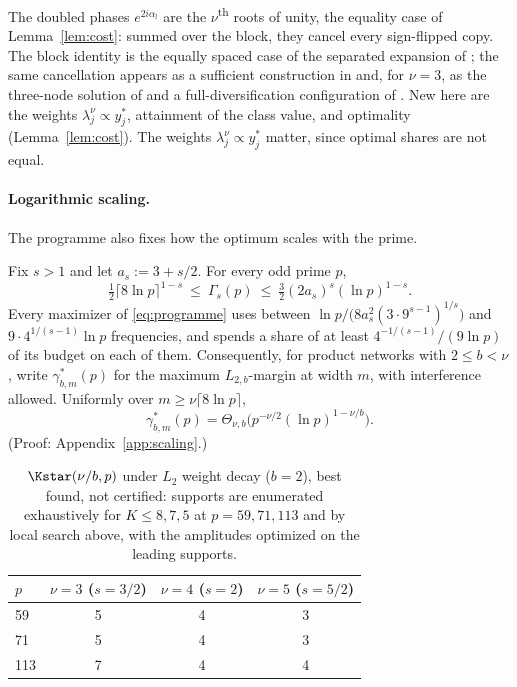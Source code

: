 The doubled phases $e^{2i\alpha_l}$ are the $\nu$\textsuperscript{th} roots of unity, the equality case of Lemma~\ref{lem:cost}: summed over the block, they cancel every sign-flipped copy. The block identity is the equally spaced case of the separated expansion of \citet[Thm.~2]{mohlenkamp2005trig}; the same cancellation appears as a sufficient construction in \citet[Lemma~B.8]{marchetti2026sequential} and, for $\nu=3$, as the three-node solution of \citet{tian2025composing} and a full-diversification configuration of \citet[Sec.~4]{he2026mechanism}. New here are the weights $\lambda_j^\nu\propto y^*_j$, attainment of the class value, and optimality (Lemma~\ref{lem:cost}). The weights $\lambda_j^\nu\propto y^*_j$ matter, since optimal shares are not equal.

\paragraph{Logarithmic scaling.} The programme also fixes how the optimum scales with the prime.

\begin{theorem}\label{thm:scaling}
Fix $s>1$ and let $a_s:=3+s/2$. For every odd prime $p$,
\[
\tfrac12\lceil8\ln p\rceil^{1-s}\ \le\ \Gamma_s(p)\ \le\ \tfrac32(2a_s)^s(\ln p)^{1-s}.
\]
Every maximizer of \eqref{eq:programme} uses between $\ln p/\big(8a_s^2(3\cdot9^{s-1})^{1/s}\big)$ and $9\cdot4^{1/(s-1)}\ln p$ frequencies, and spends a share of at least $4^{-1/(s-1)}/(9\ln p)$ of its budget on each of them. Consequently, for product networks with $2\le b<\nu$, write $\gamma^*_{b,m}(p)$ for the maximum $L_{2,b}$-margin at width $m$, with interference allowed. Uniformly over $m\ge\nu\lceil8\ln p\rceil$,
\[
\gamma^*_{b,m}(p)=\Theta_{\nu,b}\big(p^{-\nu/2}(\ln p)^{1-\nu/b}\big).
\]
(Proof: Appendix~\ref{app:scaling}.)
\end{theorem}

\begin{table}[h!]
\centering
\caption{$\Kstar(\nu/b,p)$ under $L_2$ weight decay ($b=2$), best found, not certified: supports are enumerated exhaustively for $K\le8,7,5$ at $p=59,71,113$ and by local search above, with the amplitudes optimized on the leading supports.}
\label{tab:kstar}
\begin{tabular}{lccc}
\toprule
$p$ & $\nu=3$ ($s=3/2$) & $\nu=4$ ($s=2$) & $\nu=5$ ($s=5/2$)\\
\midrule
59 & 5 & 4 & 3\\
71 & 5 & 4 & 3\\
113 & 7 & 4 & 4\\
\bottomrule
\end{tabular}
\end{table}


